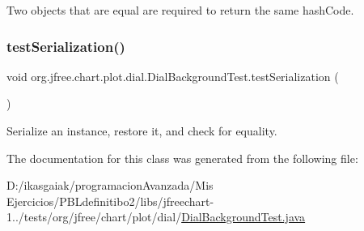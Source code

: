 Two objects that are equal are required to return the same hash\+Code. \mbox{\label{classorg_1_1jfree_1_1chart_1_1plot_1_1dial_1_1_dial_background_test_a4e20f15b87c2c79add1979639218203d}} 
\subsubsection{\texorpdfstring{test\+Serialization()}{testSerialization()}}
{\footnotesize\ttfamily void org.\+jfree.\+chart.\+plot.\+dial.\+Dial\+Background\+Test.\+test\+Serialization (\begin{DoxyParamCaption}{ }\end{DoxyParamCaption})}

Serialize an instance, restore it, and check for equality. 

The documentation for this class was generated from the following file\+:\begin{DoxyCompactItemize}
\item 
D\+:/ikasgaiak/programacion\+Avanzada/\+Mis Ejercicios/\+P\+B\+Ldefinitibo2/libs/jfreechart-\/1../tests/org/jfree/chart/plot/dial/\mbox{\hyperlink{_dial_background_test_8java}{Dial\+Background\+Test.\+java}}\end{DoxyCompactItemize}
